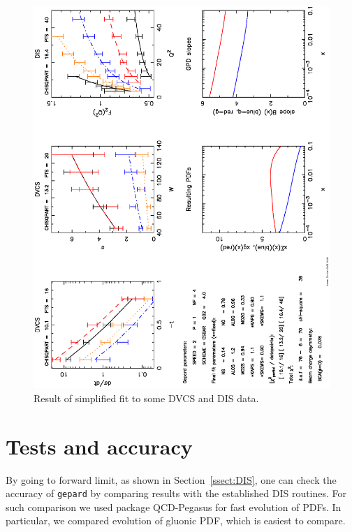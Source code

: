 \documentclass[12pt]{article}
\begin{document}
\begin{figure}
\begin{center}
\includegraphics[scale=0.72]{examplefit}
\end{center}
\caption{Result of simplified fit to some DVCS and DIS data.}
\label{fig:fitps}
\end{figure}


\section{Tests and accuracy}
\label{sec:tests}

By going to forward limit, as shown in Section~\ref{ssect:DIS}, one can check the accuracy of 
\texttt{gepard} by comparing results with the established DIS routines.
For such comparison we used package {\sc QCD-Pegasus} \cite{Vogt:2004ns} for fast evolution of PDFs.
In particular, we compared evolution of gluonic PDF, which is easiest to compare.
\end{document}
